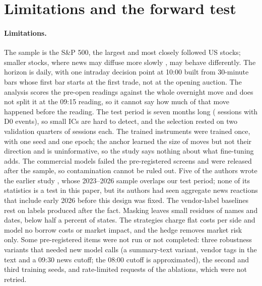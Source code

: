 \section{Limitations and the forward test}\label{sec:limits}

\paragraph{Limitations.} The sample is the S\&P 500, the largest and most closely followed US stocks; smaller
stocks, where news may diffuse more slowly \citep{hong2000}, may behave differently. The horizon is daily, with one
intraday decision point at 10:00 built from 30-minute bars whose first bar starts at the first trade, not at the
opening auction. The analysis scores the pre-open readings against the whole overnight move and does not split it
at the 09:15 reading, so it cannot say how much of that move happened before the reading. The test period is seven
months long ( sessions with D0 events), so small ICs are hard to detect, and the selection
rested on two validation quarters of  sessions each. The trained instruments were trained once,
with one seed and one epoch; the anchor learned the size of moves but not their direction and is uninformative, so
the study says nothing about what fine-tuning adds. The commercial models failed the pre-registered screens and
were released after the sample, so contamination cannot be ruled out. Five of the authors wrote the earlier study
\citep{kargarzadeh2026}, whose 2023--2026 sample overlaps our test period; none of its statistics is a test in
this paper, but its authors had seen aggregate news reactions that include early 2026 before this design was
fixed. The vendor-label baselines rest on labels
produced after the fact. Masking leaves small residues of names and dates, below half a percent of states. The
strategies charge flat costs per side and model no borrow costs or market impact, and the hedge removes market risk
only. Some pre-registered items were not run or not completed: three robustness variants that needed new model
calls (a summary-text variant, vendor tags in the text and a 09:30 news cutoff; the 08:00 cutoff is approximated),
the second and third training seeds, and  rate-limited requests of the ablations, which were
not retried.

